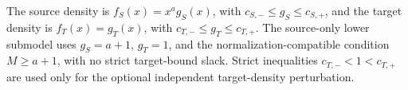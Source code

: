 The source density is \(f_S(x)=x^ag_S(x)\), with \(c_{S,-}\le g_S\le c_{S,+}\), and the target density is \(f_T(x)=g_T(x)\), with \(c_{T,-}\le g_T\le c_{T,+}\). The source-only lower submodel uses \(g_S=a+1\), \(g_T=1\), and the normalization-compatible condition \(M\ge a+1\), with no strict target-bound slack. Strict inequalities \(c_{T,-}<1<c_{T,+}\) are used only for the optional independent target-density perturbation.